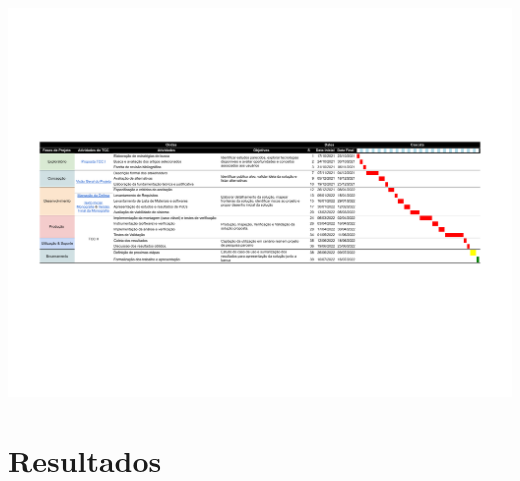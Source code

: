 \documentclass[10pt,brazil]{beamer}
\theoremstyle{definition}
\begin{document}
\begin{frame}[plain]
  \hspace*{-10mm}
  \includegraphics[width=\paperwidth]{TCC cronograma - Sheet1.pdf}
\end{frame}


\section{Resultados}
\end{document}
